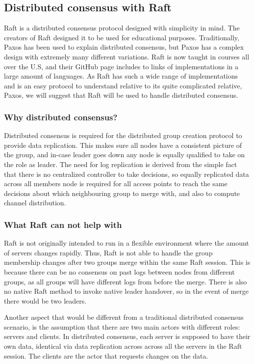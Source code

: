 \subsection{Distributed consensus with Raft}
Raft \cite{raftio} is a distributed consensus protocol designed with simplicity in mind. The creators of Raft designed it to be used for educational purposes. Traditionally, Paxos has been used to explain distributed consensus, but Paxos has a complex design with extremely many different variations. Raft is now taught in courses all over the U.S, and their GitHub page includes to links
of implementations in a large amount of languages. As Raft has such a wide range of implementations and is an easy protocol to understand relative to its quite complicated relative, Paxos, 
we will suggest that Raft will be used to handle distributed consensus. 

\subsubsection{Why distributed consensus?}
Distributed consensus is required for the distributed group creation protocol to provide data replication.
This makes sure all nodes have a consistent picture of the group, and in-case leader goes down any node is equally qualified to take on the role as leader.
The need for log replication is derived from the simple fact that there is no centralized controller to take decisions, so equally replicated data across all members node is required for all access
points to reach the same decisions about which neighbouring group to merge with, and also to compute channel distribution.  

\subsubsection{What Raft can not help with}
Raft is not originally intended to run in a flexible environment where the amount of servers changes rapidly. Thus, Raft is not able to handle the group membership changes
after two groups merge within the same Raft session. This is because there can be no consensus on past logs between nodes from different groups, as all groups will have different logs from before the merge. There is also no native Raft method to invoke native leader handover, so in the event of merge there would be two leaders. 

Another aspect that would be different from a traditional distributed consensus scenario, is the assumption that there are two main actors with different roles: servers and clients.
In distributed consensus, each server is supposed to have their own data, identical via data replication across across all the servers in the Raft session. The clients are the actor that requests 
changes on the data.

